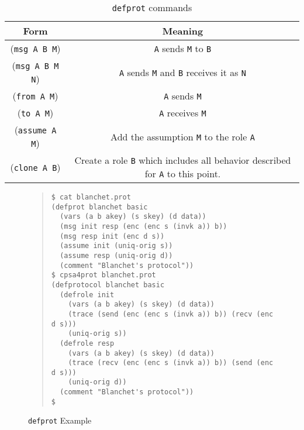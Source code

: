\begin{table}
  \begin{center}
    \begin{tabular}{c|c}
      Form & Meaning \\
      \hline
      (\texttt{msg A B M}) & \texttt{A} sends \texttt{M} to \texttt{B} \\
      (\texttt{msg A B M N}) & \texttt{A} sends \texttt{M} and \texttt{B} receives it as \texttt{N}\\
      (\texttt{from A M}) & \texttt{A} sends \texttt{M}\\
      (\texttt{to A M}) & \texttt{A} receives \texttt{M}\\
      (\texttt{assume A M}) & Add the assumption \texttt{M} to the role \texttt{A}\\
      (\texttt{clone A B}) & Create a role \texttt{B} which includes all behavior described for \texttt{A} to this point.
    \end{tabular}
  \end{center}
  \caption{\texttt{defprot} commands}\label{tab:defprot_commands}
  \end{table}

\begin{figure}
  \begin{quote}
    \begin{verbatim}
$ cat blanchet.prot
(defprot blanchet basic
  (vars (a b akey) (s skey) (d data))
  (msg init resp (enc (enc s (invk a)) b))
  (msg resp init (enc d s))
  (assume init (uniq-orig s))
  (assume resp (uniq-orig d))
  (comment "Blanchet's protocol"))
$ cpsa4prot blanchet.prot
(defprotocol blanchet basic
  (defrole init
    (vars (a b akey) (s skey) (d data))
    (trace (send (enc (enc s (invk a)) b)) (recv (enc d s)))
    (uniq-orig s))
  (defrole resp
    (vars (a b akey) (s skey) (d data))
    (trace (recv (enc (enc s (invk a)) b)) (send (enc d s)))
    (uniq-orig d))
  (comment "Blanchet's protocol"))
$
    \end{verbatim}
  \end{quote}
\caption{\texttt{defprot} Example}\label{fig:defprot}
\end{figure}
